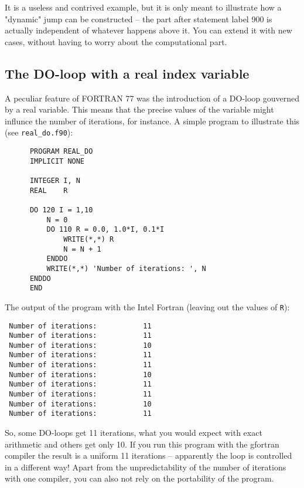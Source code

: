 It is a useless and contrived example, but it is only meant to illustrate how
a "dynamic" jump can be constructed -- the part after statement label 900
is actually independent of whatever happens above it. You can extend it with
new cases, without having to worry about the computational part.

\subsection{The DO-loop with a real index variable}
A peculiar feature of FORTRAN 77 was the introduction of a DO-loop gouverned
by a real variable. This means that the precise values of the variable might
influnce the number of iterations, for instance. A simple program to
illustrate this (see \verb+real_do.f90+):
\begin{verbatim}
      PROGRAM REAL_DO
      IMPLICIT NONE

      INTEGER I, N
      REAL    R

      DO 120 I = 1,10
          N = 0
          DO 110 R = 0.0, 1.0*I, 0.1*I
              WRITE(*,*) R
              N = N + 1
          ENDDO
          WRITE(*,*) 'Number of iterations: ', N
      ENDDO
      END
\end{verbatim}

The output of the program with the Intel Fortran (leaving out the values of \verb+R+):
\begin{verbatim}
 Number of iterations:           11
 Number of iterations:           11
 Number of iterations:           10
 Number of iterations:           11
 Number of iterations:           11
 Number of iterations:           10
 Number of iterations:           11
 Number of iterations:           11
 Number of iterations:           10
 Number of iterations:           11
\end{verbatim}

So, some DO-loops get 11 iterations, what you would expect with exact arithmetic
and others get only 10. If you run this program with the gfortran compiler the result
is a uniform 11 iterations -- apparently the loop is controlled in a different way!
Apart from the unpredictability of the number of iterations with one compiler, you
can also not rely on the portability of the program.
